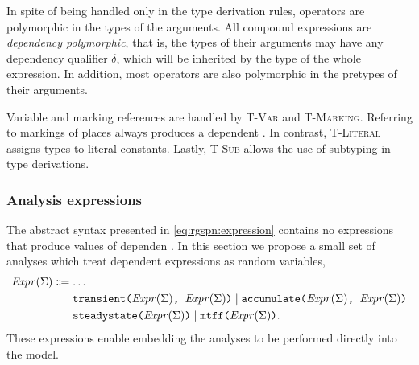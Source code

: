 In spite of being handled only in the type derivation rules, operators are polymorphic in the types of the arguments. All compound expressions are \emph{dependency polymorphic}, that is, the types of their arguments may have any dependency qualifier \(\delta\), which will be inherited by the type of the whole expression. In addition, most operators are also polymorphic in the pretypes of their arguments.

Variable and marking references are handled by \textsc{T-Var} and \textsc{T-Marking}. Referring to markings of places always produces a  dependent . In contrast, \textsc{T-Literal} assigns  types to literal constants. Lastly, \textsc{T-Sub} allows the use of subtyping in type derivations.

\subsubsection{Analysis expressions}

The abstract syntax presented in \cref{eq:rgspn:expression} contains no expressions that produce values of dependen . In this section we propose a small set of analyses which treat  dependent expressions as random variables,
\begin{equation}
  \begin{aligned}
    \ebnfV{\rel{Expr}(\Sigma)} &\ebnfEq \ldots \\
    &\ebnfCont \lit{transient(\(\ebnfV{\rel{Expr}(\Sigma)}\), \(\ebnfV{\rel{Expr}(\Sigma)}\))} \mid \lit{accumulate(\(\ebnfV{\rel{Expr}(\Sigma)}\), \(\ebnfV{\rel{Expr}(\Sigma)}\))} \\
    &\ebnfCont \lit{steadystate(\(\ebnfV{\rel{Expr}(\Sigma)}\))} \mid \lit{mtff(\(\ebnfV{\rel{Expr}(\Sigma)}\))} \text.
  \end{aligned}
\end{equation}
These expressions enable embedding the analyses to be performed directly into the  model.

